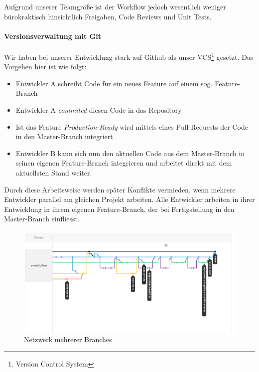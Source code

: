 \documentclass[titlepage, a4paper, 11pt]{scrartcl}
\begin{document}
        Aufgrund unserer Teamgröße ist der Workflow jedoch wesentlich weniger bürokraktisch hinsichtlich Freigaben, Code Reviews und Unit Tests.

        \paragraph{Versionsverwaltung mit Git}

          Wir haben bei unserer Entwicklung stark auf Github als unser VCS\footnote{Version Control System} gesetzt. Das Vorgehen hier ist wie folgt:

          \begin{itemize}
            \item Entwickler A schreibt Code für ein neues Feature auf einem sog. Feature-Branch
            \item Entwickler A \textit{commited} diesen Code in das Repository
            \item Ist das Feature \textit{Production-Ready} wird mittels eines Pull-Requests der Code in den Master-Branch integriert
            \item Entwickler B kann sich nun den aktuellen Code aus dem Master-Branch in seinen eigenen Feature-Branch integrieren und arbeitet direkt mit dem aktuellsten Stand weiter.
          \end{itemize}

          Durch diese Arbeitsweise werden später Konflikte vermieden, wenn mehrere Entwickler parallel am gleichen Projekt arbeiten.
          Alle Entwickler arbeiten in ihrer Entwicklung in ihrem eigenen Feature-Branch, der bei Fertigstellung in den Master-Branch einfliesst.

          \begin{figure}[H]
            \centering
            \includegraphics[width=.8\textwidth]{gitBranches.PNG}
            \caption{Netzwerk mehrerer Branches}
            \label{GitNetworks}
          \end{figure}
          
\end{document}
